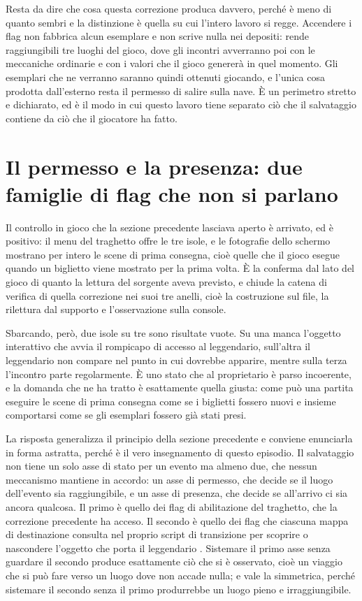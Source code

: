 Resta da dire che cosa questa correzione produca davvero, perché è meno di quanto sembri e la distinzione è quella su cui l'intero lavoro si regge. Accendere i flag non fabbrica alcun esemplare e non scrive nulla nei depositi: rende raggiungibili tre luoghi del gioco, dove gli incontri avverranno poi con le meccaniche ordinarie e con i valori che il gioco genererà in quel momento. Gli esemplari che ne verranno saranno quindi ottenuti giocando, e l'unica cosa prodotta dall'esterno resta il permesso di salire sulla nave. È un perimetro stretto e dichiarato, ed è il modo in cui questo lavoro tiene separato ciò che il salvataggio contiene da ciò che il giocatore ha fatto.

\section{Il permesso e la presenza: due famiglie di flag che non si parlano}

Il controllo in gioco che la sezione precedente lasciava aperto è arrivato, ed è positivo: il menu del traghetto offre le tre isole, e le fotografie dello schermo mostrano per intero le scene di prima consegna, cioè quelle che il gioco esegue quando un biglietto viene mostrato per la prima volta. È la conferma dal lato del gioco di quanto la lettura del sorgente aveva previsto, e chiude la catena di verifica di quella correzione nei suoi tre anelli, cioè la costruzione sul file, la rilettura dal supporto e l'osservazione sulla console.

Sbarcando, però, due isole su tre sono risultate vuote. Su una manca l'oggetto interattivo che avvia il rompicapo di accesso al leggendario, sull'altra il leggendario non compare nel punto in cui dovrebbe apparire, mentre sulla terza l'incontro parte regolarmente. È uno stato che al proprietario è parso incoerente, e la domanda che ne ha tratto è esattamente quella giusta: come può una partita eseguire le scene di prima consegna come se i biglietti fossero nuovi e insieme comportarsi come se gli esemplari fossero già stati presi.

La risposta generalizza il principio della sezione precedente e conviene enunciarla in forma astratta, perché è il vero insegnamento di questo episodio. Il salvataggio non tiene un solo asse di stato per un evento ma almeno due, che nessun meccanismo mantiene in accordo: un asse di permesso, che decide se il luogo dell'evento sia raggiungibile, e un asse di presenza, che decide se all'arrivo ci sia ancora qualcosa. Il primo è quello dei flag di abilitazione del traghetto, che la correzione precedente ha acceso. Il secondo è quello dei flag che ciascuna mappa di destinazione consulta nel proprio script di transizione per scoprire o nascondere l'oggetto che porta il leggendario \cite{pokeemerald}. Sistemare il primo asse senza guardare il secondo produce esattamente ciò che si è osservato, cioè un viaggio che si può fare verso un luogo dove non accade nulla; e vale la simmetrica, perché sistemare il secondo senza il primo produrrebbe un luogo pieno e irraggiungibile.

